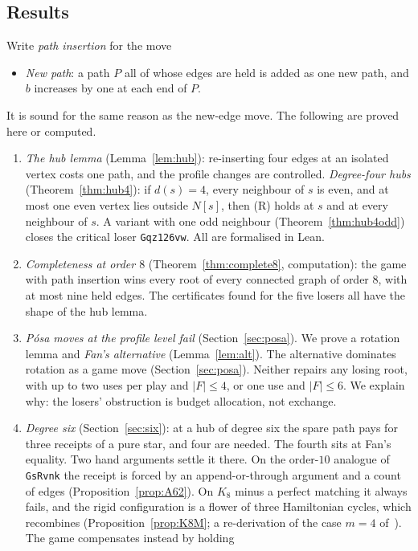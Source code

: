 \documentclass[11pt]{amsart}
\theoremstyle{definition}
\begin{document}
\subsection*{Results} Write \emph{path insertion} for the move
\begin{itemize}
\item \emph{New path}: a path $P$ all of whose edges are held is added as one new path, and $b$
increases by one at each end of $P$.
\end{itemize}
It is sound for the same reason as the new-edge move. The following are proved here or computed.
\begin{enumerate}
\item \emph{The hub lemma} (Lemma~\ref{lem:hub}): re-inserting four edges at an isolated vertex
costs one path, and the profile changes are controlled. \emph{Degree-four hubs}
(Theorem~\ref{thm:hub4}): if $d(s)=4$, every neighbour of $s$ is even, and at most one even vertex
lies outside $N[s]$, then (R) holds at $s$ and at every neighbour of $s$. A variant with one odd
neighbour (Theorem~\ref{thm:hub4odd}) closes the critical loser \texttt{Gqz\char126vw}. All are
formalised in Lean.
\item \emph{Completeness at order $8$} (Theorem~\ref{thm:complete8}, computation): the game with
path insertion wins every root of every connected graph of order $8$, with at most nine held
edges. The certificates found for the five losers all have the shape of the hub lemma.
\item \emph{P\'osa moves at the profile level fail} (Section~\ref{sec:posa}). We prove a rotation
lemma and \emph{Fan's alternative} (Lemma~\ref{lem:alt}). The alternative dominates rotation
as a game move (Section~\ref{sec:posa}). Neither repairs any losing root, with up to two uses per play and
$|F|\le4$, or one use and $|F|\le6$. We explain why: the losers' obstruction is budget
allocation, not exchange.
\item \emph{Degree six} (Section~\ref{sec:six}): at a hub of degree six the spare path pays for
three receipts of a pure star, and four are needed. The fourth sits at Fan's equality. Two hand
arguments settle it there. On the order-$10$ analogue of \texttt{GsRvnk} the receipt is forced by
an append-or-through argument and a count of edges (Proposition~\ref{prop:A62}). On $K_8$ minus a
perfect matching it always fails, and the rigid configuration is a flower of three Hamiltonian
cycles, which recombines (Proposition~\ref{prop:K8M}; a re-derivation of the case $m=4$
of~\cite[Thm.~10.21]{SP}). The game compensates instead by holding

\end{enumerate}
\end{document}
